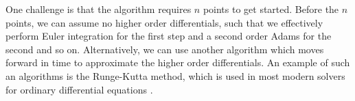 One challenge is that the algorithm requires $n$ points to get started. Before the $n$ points, we can assume no higher order differentials, such that we effectively perform Euler integration for the first step and a second order Adams for the second and so on. Alternatively, we can use another algorithm which moves forward in time to approximate the higher order differentials. An example of such an algorithms is the Runge-Kutta method, which is used in most modern solvers for ordinary differential equations \cite{butcher_numerical_2000}. 




